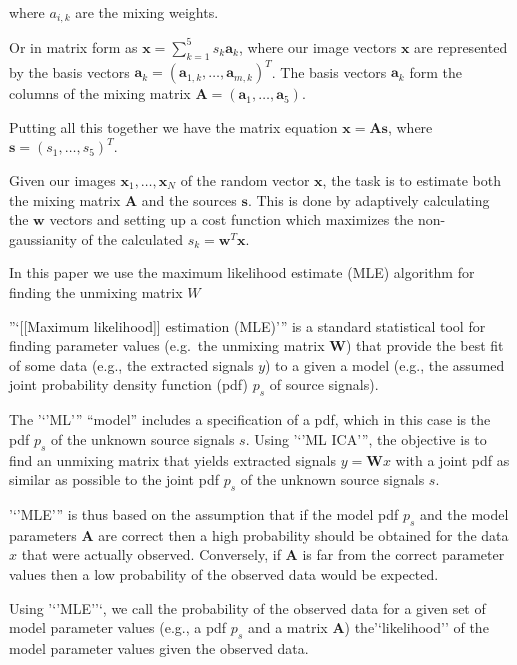 \documentclass[11pt]{article}
\begin{document}
where \(a_{i,k}\) are the mixing weights.

Or in matrix form as
\(\boldsymbol{x}=\sum_{k=1}^{5} s_k \boldsymbol{a}_k\), where our image
vectors \(\boldsymbol{x}\) are represented by the basis vectors
\(\boldsymbol{a}_k=(\boldsymbol{a}_{1,k},\ldots,\boldsymbol{a}_{m,k})^T\).
The basis vectors \(\boldsymbol{a}_k\) form the columns of the mixing
matrix \(\boldsymbol{A}=(\boldsymbol{a}_1,\ldots,\boldsymbol{a}_5)\).

Putting all this together we have the matrix equation
\(\boldsymbol{x}=\boldsymbol{A} \boldsymbol{s}\), where
\(\boldsymbol{s}=(s_1,\ldots,s_5)^T\).

Given our images \(\boldsymbol{x}_1,\ldots,\boldsymbol{x}_N\) of the
random vector \(\boldsymbol{x}\), the task is to estimate both the
mixing matrix \(\boldsymbol{A}\) and the sources \(\boldsymbol{s}\).
This is done by adaptively calculating the \(\boldsymbol{w}\) vectors
and setting up a cost function which maximizes the non-gaussianity of
the calculated \(s_k = \boldsymbol{w}^T \boldsymbol{x}\).

In this paper we use the maximum likelihood estimate (MLE) algorithm for
finding the unmixing matrix \(W\)

''`{[}{[}Maximum likelihood{]}{]} estimation (MLE)''' is a standard
statistical tool for finding parameter values (e.g.~the unmixing matrix
\(\mathbf{W}\)) that provide the best fit of some data (e.g., the
extracted signals \(y\)) to a given a model (e.g., the assumed joint
probability density function (pdf) \(p_s\) of source signals).

The '`'ML''' ``model'' includes a specification of a pdf, which in this
case is the pdf \(p_s\) of the unknown source signals \(s\). Using '`'ML
ICA''', the objective is to find an unmixing matrix that yields
extracted signals \(y = \mathbf{W}x\) with a joint pdf as similar as
possible to the joint pdf \(p_s\) of the unknown source signals \(s\).

'`'MLE''' is thus based on the assumption that if the model pdf \(p_s\)
and the model parameters \(\mathbf{A}\) are correct then a high
probability should be obtained for the data \(x\) that were actually
observed. Conversely, if \(\mathbf{A}\) is far from the correct
parameter values then a low probability of the observed data would be
expected.

Using '`'MLE''`, we call the probability of the observed data for a
given set of model parameter values (e.g., a pdf \(p_s\) and a matrix
\(\mathbf{A}\)) the'`likelihood'' of the model parameter values given
the observed data.
\end{document}
